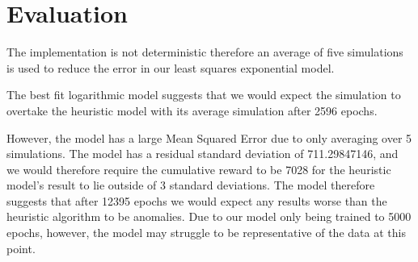 \section{Evaluation}

The implementation is not deterministic therefore an average of five simulations is used to reduce the error in our least squares exponential model. 

The best fit logarithmic model suggests that we would expect the simulation to overtake the heuristic model with its average simulation after 2596 epochs.

However, the model has a large Mean Squared Error due to only averaging over 5 simulations.
The model has a residual standard deviation of 711.29847146, and we would therefore require the cumulative reward to be 7028 for the heuristic model's result to lie outside of 3 standard deviations.
The model therefore suggests that after 12395 epochs we would expect any results worse than the heuristic algorithm to be anomalies.
Due to our model only being trained to 5000 epochs, however, the model may struggle to be representative of the data at this point.


